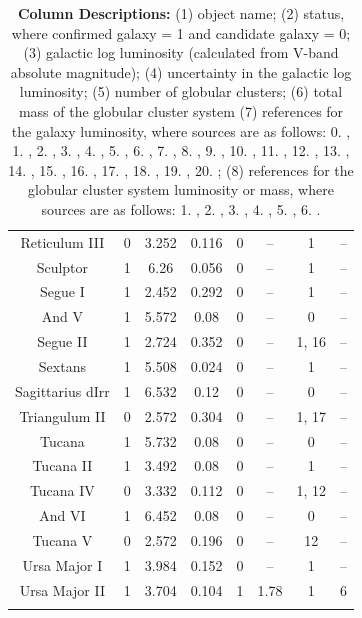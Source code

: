 \documentclass[twocolumn]{aastex631}
\begin{document}
\begin{longtable}{cccccccc}
Reticulum III & 0 & 3.252 & 0.116 & 0 & -- & 1 & -- \\
Sculptor & 1 & 6.26 & 0.056 & 0 & -- & 1 & -- \\
Segue I & 1 & 2.452 & 0.292 & 0 & -- & 1 & -- \\
And V & 1 & 5.572 & 0.08 & 0 & -- & 0 & -- \\
Segue II & 1 & 2.724 & 0.352 & 0 & -- & 1, 16 & -- \\
Sextans & 1 & 5.508 & 0.024 & 0 & -- & 1 & -- \\
Sagittarius dIrr & 1 & 6.532 & 0.12 & 0 & -- & 0 & -- \\
Triangulum II & 0 & 2.572 & 0.304 & 0 & -- & 1, 17 & -- \\
Tucana & 1 & 5.732 & 0.08 & 0 & -- & 0 & -- \\
Tucana II & 1 & 3.492 & 0.08 & 0 & -- & 1 & -- \\
Tucana IV & 0 & 3.332 & 0.112 & 0 & -- & 1, 12 & -- \\
And VI & 1 & 6.452 & 0.08 & 0 & -- & 0 & -- \\
Tucana V & 0 & 2.572 & 0.196 & 0 & -- & 12 & -- \\
Ursa Major I & 1 & 3.984 & 0.152 & 0 & -- & 1 & -- \\
Ursa Major II & 1 & 3.704 & 0.104 & 1 & 1.78 & 1 & 6 \\

\hline \hline 
\caption{\textbf{Column Descriptions:} (1) object name; (2) status, where confirmed galaxy = 1 and candidate galaxy = 0; (3) galactic log luminosity (calculated from V-band absolute magnitude); (4) uncertainty in the galactic log luminosity; (5) number of globular clusters; (6) total mass of the globular cluster system (7) references for the galaxy luminosity, where sources are as follows: 0. \cite{McConnachie2012}, 1. \cite{Simon2019}, 2. \cite{Licquia2015}, 3. \cite{Makarov2014}, 4. \cite{Homma2018}, 5. \cite{Torrealba2019}, 6. \cite{Carlin2018}, 7. \cite{Ji2020}, 8. \cite{Mau2020}, 9. \cite{Conn2018}, 10. \cite{Fritz2019}, 11. \cite{Chiti2022}, 12. \cite{Simon2020}, 13. \cite{Kirby2015}, 14. \cite{Mutlu-Pakdil2018}, 15. \cite{Drlica-Wagner2016}, 16. \cite{Kirby2013}, 17. \cite{Carlin2017}, 18. \cite{Homma2019}, 19. \cite{Martin2009}, 20. \cite{Martin2016}; (8) references for the globular cluster system luminosity or mass, where sources are as follows: 1. \cite{Forbes2018}, 2. \cite{Lim2015}, 3. \cite{Fan2014}, 4. \cite{Vasiliev2021}, 5. \cite{Galleti2004}, 6. \cite{Eadie2022}.}
\end{longtable}
\end{document}
